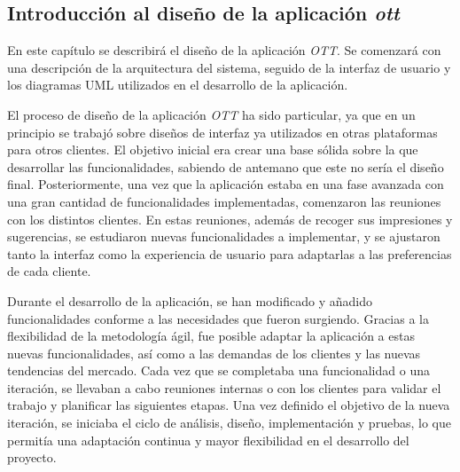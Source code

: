 \subsection{Introducción al diseño de la aplicación \textit{ott}}
\label{subsec:diseno:ott:introduccion}

En este capítulo se describirá el diseño de la aplicación \textit{OTT}. Se comenzará con una 
descripción de la arquitectura del sistema, seguido de la interfaz de usuario y los diagramas UML 
utilizados en el desarrollo de la aplicación.

El proceso de diseño de la aplicación \textit{OTT} ha sido particular, ya que en un principio
se trabajó sobre diseños de interfaz ya utilizados en otras plataformas para otros clientes. 
El objetivo inicial era crear una base sólida sobre la que desarrollar las funcionalidades, 
sabiendo de antemano que este no sería el diseño final. Posteriormente, una vez que la aplicación 
estaba en una fase avanzada con una gran cantidad de funcionalidades implementadas, comenzaron las 
reuniones con los distintos clientes. En estas reuniones, además de recoger sus impresiones y 
sugerencias, se estudiaron nuevas funcionalidades a implementar, y se ajustaron tanto la interfaz 
como la experiencia de usuario para adaptarlas a las preferencias de cada cliente.

Durante el desarrollo de la aplicación, se han modificado y añadido funcionalidades conforme a las 
necesidades que fueron surgiendo. Gracias a la flexibilidad de la metodología ágil, fue posible 
adaptar la aplicación a estas nuevas funcionalidades, así como a las demandas de los clientes y 
las nuevas tendencias del mercado. Cada vez que se completaba una funcionalidad o una iteración, 
se llevaban a cabo reuniones internas o con los clientes para validar el trabajo y planificar 
las siguientes etapas. Una vez definido el objetivo de la nueva iteración, se iniciaba el ciclo de 
análisis, diseño, implementación y pruebas, lo que permitía una adaptación continua y mayor 
flexibilidad en el desarrollo del proyecto.
